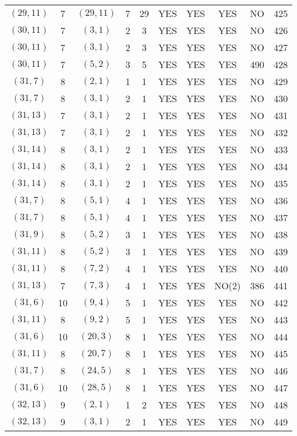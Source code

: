 \begin{longtable}{|c|c|c|c|c|c|c|c|c|c|}
$(29, 11)$ & 7 & $(29, 11)$ & 7 & 29 & YES & YES & YES & NO & 425\\
$(30, 11)$ & 7 & $(3, 1)$ & 2 & 3 & YES & YES & YES & NO & 426\\
$(30, 11)$ & 7 & $(3, 1)$ & 2 & 3 & YES & YES & YES & NO & 427\\
$(30, 11)$ & 7 & $(5, 2)$ & 3 & 5 & YES & YES & YES & 490 & 428\\
$(31, 7)$ & 8 & $(2, 1)$ & 1 & 1 & YES & YES & YES & NO & 429\\
$(31, 7)$ & 8 & $(3, 1)$ & 2 & 1 & YES & YES & YES & NO & 430\\
$(31, 13)$ & 7 & $(3, 1)$ & 2 & 1 & YES & YES & YES & NO & 431\\
$(31, 13)$ & 7 & $(3, 1)$ & 2 & 1 & YES & YES & YES & NO & 432\\
$(31, 14)$ & 8 & $(3, 1)$ & 2 & 1 & YES & YES & YES & NO & 433\\
$(31, 14)$ & 8 & $(3, 1)$ & 2 & 1 & YES & YES & YES & NO & 434\\
$(31, 14)$ & 8 & $(3, 1)$ & 2 & 1 & YES & YES & YES & NO & 435\\
$(31, 7)$ & 8 & $(5, 1)$ & 4 & 1 & YES & YES & YES & NO & 436\\
$(31, 7)$ & 8 & $(5, 1)$ & 4 & 1 & YES & YES & YES & NO & 437\\
$(31, 9)$ & 8 & $(5, 2)$ & 3 & 1 & YES & YES & YES & NO & 438\\
$(31, 11)$ & 8 & $(5, 2)$ & 3 & 1 & YES & YES & YES & NO & 439\\
$(31, 11)$ & 8 & $(7, 2)$ & 4 & 1 & YES & YES & YES & NO & 440\\
$(31, 13)$ & 7 & $(7, 3)$ & 4 & 1 & YES & YES & NO(2) & 386 & 441\\
$(31, 6)$ & 10 & $(9, 4)$ & 5 & 1 & YES & YES & YES & NO & 442\\
$(31, 11)$ & 8 & $(9, 2)$ & 5 & 1 & YES & YES & YES & NO & 443\\
$(31, 6)$ & 10 & $(20, 3)$ & 8 & 1 & YES & YES & YES & NO & 444\\
$(31, 11)$ & 8 & $(20, 7)$ & 8 & 1 & YES & YES & YES & NO & 445\\
$(31, 7)$ & 8 & $(24, 5)$ & 8 & 1 & YES & YES & YES & NO & 446\\
$(31, 6)$ & 10 & $(28, 5)$ & 8 & 1 & YES & YES & YES & NO & 447\\
$(32, 13)$ & 9 & $(2, 1)$ & 1 & 2 & YES & YES & YES & NO & 448\\
$(32, 13)$ & 9 & $(3, 1)$ & 2 & 1 & YES & YES & YES & NO & 449\\

\end{longtable}
